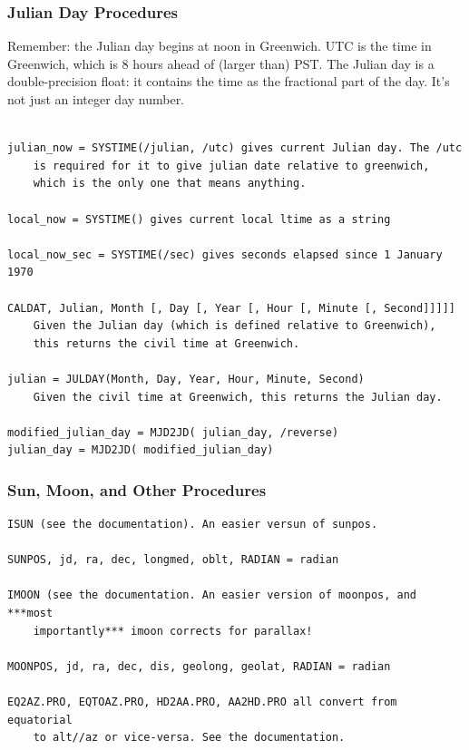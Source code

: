 \documentclass[11pt,preprint]{aastex}
\begin{document}
\subsubsection{Julian Day Procedures}
Remember: the Julian day begins at noon in Greenwich. UTC is the time in
Greenwich, which is 8 hours ahead of (larger than) PST. The Julian day
is a double-precision float: it contains the time as the fractional part
of the day. It's not just an integer day number.

\begin{verbatim}

julian_now = SYSTIME(/julian, /utc) gives current Julian day. The /utc
	is required for it to give julian date relative to greenwich,
	which is the only one that means anything.

local_now = SYSTIME() gives current local ltime as a string

local_now_sec = SYSTIME(/sec) gives seconds elapsed since 1 January 1970

CALDAT, Julian, Month [, Day [, Year [, Hour [, Minute [, Second]]]]]
	Given the Julian day (which is defined relative to Greenwich),
	this returns the civil time at Greenwich.

julian = JULDAY(Month, Day, Year, Hour, Minute, Second) 
	Given the civil time at Greenwich, this returns the Julian day.

modified_julian_day = MJD2JD( julian_day, /reverse)
julian_day = MJD2JD( modified_julian_day)
\end{verbatim}

\subsubsection{Sun, Moon, and Other Procedures}

\begin{verbatim}
ISUN (see the documentation). An easier versun of sunpos.

SUNPOS, jd, ra, dec, longmed, oblt, RADIAN = radian

IMOON (see the documentation. An easier version of moonpos, and ***most
	importantly*** imoon corrects for parallax!

MOONPOS, jd, ra, dec, dis, geolong, geolat, RADIAN = radian

EQ2AZ.PRO, EQTOAZ.PRO, HD2AA.PRO, AA2HD.PRO all convert from equatorial
	to alt//az or vice-versa. See the documentation.

\end{verbatim}
\end{document}
